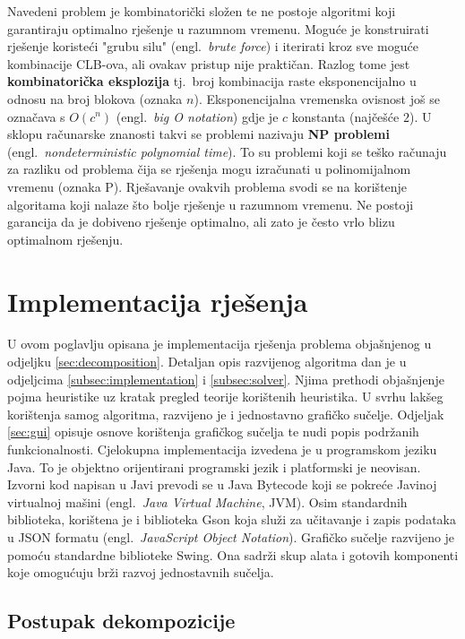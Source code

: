 \documentclass[times, utf8, diplomski]{fer}
\begin{document}
Navedeni problem je kombinatorički složen te ne postoje algoritmi koji garantiraju optimalno rješenje u razumnom vremenu. Moguće je konstruirati rješenje koristeći "grubu silu" (engl.~\textit{brute force}) i iterirati kroz sve moguće kombinacije CLB-ova, ali ovakav pristup nije praktičan. Razlog tome jest \textbf{kombinatorička eksplozija} tj.~broj kombinacija raste eksponencijalno u odnosu na broj blokova (oznaka $n$). Eksponencijalna vremenska ovisnost još se označava s $O(c^{n})$ (engl.~\textit{big O notation}) gdje je $c$ konstanta (najčešće $2$). U sklopu računarske znanosti takvi se problemi nazivaju \textbf{NP problemi} (engl.~\textit{nondeterministic polynomial time}). To su problemi koji se teško računaju za razliku od problema čija se rješenja mogu izračunati u polinomijalnom vremenu (oznaka P). Rješavanje ovakvih problema svodi se na korištenje algoritama koji nalaze što bolje rješenje u razumnom vremenu. Ne postoji garancija da je dobiveno rješenje optimalno, ali zato je često vrlo blizu optimalnom rješenju.


\chapter{Implementacija rješenja} \label{chapter:impl}

U ovom poglavlju opisana je implementacija rješenja problema objašnjenog u odjeljku \ref{sec:decomposition}. Detaljan opis razvijenog algoritma dan je u odjeljcima \ref{subsec:implementation} i \ref{subsec:solver}. Njima prethodi objašnjenje pojma heuristike uz kratak pregled teorije korištenih heuristika. U svrhu lakšeg korištenja samog algoritma, razvijeno je i jednostavno grafičko sučelje. Odjeljak \ref{sec:gui} opisuje osnove korištenja grafičkog sučelja te nudi popis podržanih funkcionalnosti. Cjelokupna implementacija izvedena je u programskom jeziku Java. To je objektno orijentirani programski jezik i platformski je neovisan. Izvorni kod napisan u Javi prevodi se u Java Bytecode koji se pokreće Javinoj virtualnoj mašini (engl.~\textit{Java Virtual Machine}, JVM). Osim standardnih biblioteka, korištena je i biblioteka Gson koja služi za učitavanje i zapis podataka u JSON formatu (engl.~\textit{JavaScript Object Notation}). Grafičko sučelje razvijeno je pomoću standardne biblioteke Swing. Ona sadrži skup alata i gotovih komponenti koje omogućuju brži razvoj jednostavnih sučelja.


\section{Postupak dekompozicije} \label{sec:impl_decomp}
\end{document}
